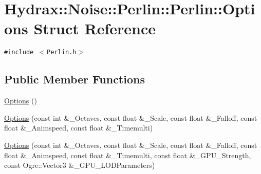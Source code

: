 \hypertarget{struct_hydrax_1_1_noise_1_1_perlin_1_1_options}{
\section{Hydrax::Noise::Perlin::Perlin::Options Struct Reference}
\label{struct_hydrax_1_1_noise_1_1_perlin_1_1_options}
}
{\tt \#include $<$Perlin.h$>$}

\subsection*{Public Member Functions}
\begin{CompactItemize}
\item 
\hyperlink{struct_hydrax_1_1_noise_1_1_perlin_1_1_options_357458115476a5b0b9ba11060fb345df}{Options} ()
\item 
\hyperlink{struct_hydrax_1_1_noise_1_1_perlin_1_1_options_83c9cc814d0713f1424fbf1e7e4b2f70}{Options} (const int \&\_\-Octaves, const float \&\_\-Scale, const float \&\_\-Falloff, const float \&\_\-Animspeed, const float \&\_\-Timemulti)
\item 
\hyperlink{struct_hydrax_1_1_noise_1_1_perlin_1_1_options_be063c5cb7eba48426af6edced02fc15}{Options} (const int \&\_\-Octaves, const float \&\_\-Scale, const float \&\_\-Falloff, const float \&\_\-Animspeed, const float \&\_\-Timemulti, const float \&\_\-GPU\_\-Strength, const Ogre::Vector3 \&\_\-GPU\_\-LODParameters)
\end{CompactItemize}
